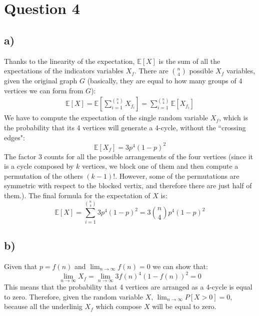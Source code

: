 \documentclass[11pt,a4paper]{article}
\begin{document}
\section*{Question 4}
\subsection*{a)}
Thanks to the linearity of the expectation, $\mathbb{E}[X]$ is the sum of all the expectations of the indicators
variables $X_f$. There are $\binom{n}{4}$ possible $X_f$ variables, given the original graph $G$ (basically, they
are equal to how many groups of 4 vertices we can form from $G$):
\begin{gather}
\mathbb{E}[X] = \mathbb{E}\left[\sum_{i=1}^{\binom{n}{4}}X_{f_i}\right] = \sum_{i=1}^{\binom{n}{4}} \mathbb{E}[X_{f_i}]
\end{gather}
We have to compute the expectation of the single random variable $X_f$, which is the probability that its 4 vertices
will generate a 4-cycle, without the ``crossing edges":
\begin{equation}
\mathbb{E}[X_f] = 3p^4(1-p)^2
\end{equation}
The factor $3$ counts for all the possible arrangements of the four vertices (since it is a cycle composed by $k$ vertices, we block one of them and then compute a permutation of the others $(k-1)!$. However, some of the permutations are symmetric
with respect to the blocked vertix, and therefore there are just half of them.). The final formula for
the expectation of $X$ is:
\begin{equation}
\mathbb{E}[X] = \sum_{i=1}^{\binom{n}{4}} 3p^4(1-p)^2 = 3\binom{n}{4}p^4(1-p)^2
\end{equation}

\subsection*{b)}
Given that $p=f(n)$ and $\lim_{n \rightarrow \infty}f(n) = 0$ we can show that: 
\begin{equation}
\lim_{n \rightarrow \infty} X_f = \lim_{n \rightarrow \infty} 3f(n)^4(1-f(n))^2 = 0
\end{equation}
This means that the probability that 4 vertices are arranged as a 4-cycle is equal to zero. Therefore, given the random 
variable $X$, $\lim_{n \rightarrow \infty} P[X>0] = 0$, because all the underlinig $X_f$ which compose $X$ will be equal to zero.
\end{document}

